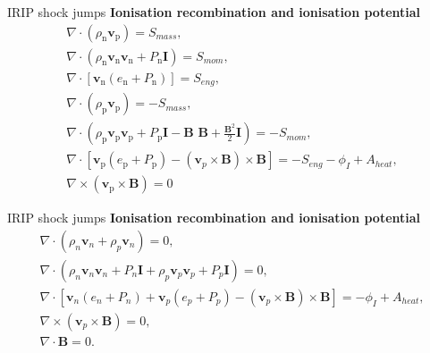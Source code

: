 \documentclass[10pt,aspectratio=169,usenames,dvipsnames]{beamer}
\begin{document}
\begin{frame}{IRIP shock jumps}
\textbf{Ionisation recombination and ionisation potential}
\begin{gather}
\nabla \cdot (\rho _{\text{n}} \textbf{v}_{\text{p}})= S_{mass}, \\
\nabla \cdot (\rho _{\text{n}} \textbf{v}_{\text{n}} \textbf{v}_{\text{n}} + P_{\text{n}} \textbf{I}) = S_{mom}, \\
\nabla \cdot \left[\textbf{v}_{\text{n}} (e_{\text{n}} +P_{\text{n}}) \right] = S_{eng}, \\
\nabla \cdot (\rho_{\text{p}} \textbf{v}_{\text{p}}) = - S_{mass},\\
\nabla \cdot \left( \rho_{\text{p}} \textbf{v}_{\text{p}} \textbf{v}_{\text{p}} + P_{\text{p}} \textbf{I} - \textbf{B B} + \frac{\textbf{B}^2}{2} \textbf{I} \right) = - S_{mom}, \\
\nabla \cdot \left[ \textbf{v}_{\text{p}} ( e_{\text{p}} + P_{\text{p}}) -  (\textbf{v}_p \times \textbf{B}) \times \textbf{B} \right] =  -S_{eng} -\phi _I +A_{heat}, \\
\nabla \times \left(\textbf{v}_{\text{p}} \times \textbf{B} \right) = 0
\end{gather}
\end{frame}

\begin{frame}{IRIP shock jumps}
\textbf{Ionisation recombination and ionisation potential}
\begin{gather}
    \nabla \cdot (\rho _n \textbf{v}_n +\rho _p \textbf{v}_n)= 0, \\
    \nabla \cdot (\rho _n \textbf{v}_n \textbf{v}_n + P_n \textbf{I} +\rho _p \textbf{v}_p \textbf{v}_p + P_p \textbf{I}) = 0, \\
    \nabla \cdot \left[\textbf{v}_n (e_n +P_n) +\textbf{v}_p (e_p +P_p) -  (\textbf{v}_p \times \textbf{B}) \times \textbf{B} \right] = -\phi_I + A_{heat}, \label{eqn:iripen} \\
    \nabla \times \left(\textbf{v}_p \times \textbf{B} \right) = 0, \\
    \nabla \cdot \textbf{B} = 0.
\end{gather}
\end{frame}
\end{document}
